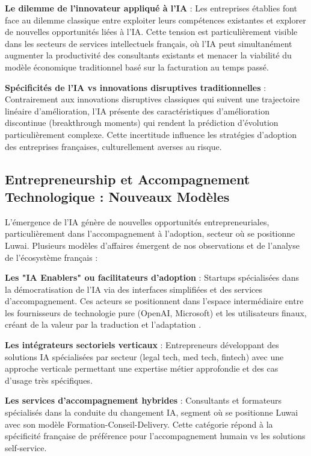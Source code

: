 \textbf{Le dilemme de l'innovateur appliqué à l'IA} : Les entreprises établies font face au dilemme classique entre exploiter leurs compétences existantes et explorer de nouvelles opportunités liées à l'IA. Cette tension est particulièrement visible dans les secteurs de services intellectuels français, où l'IA peut simultanément augmenter la productivité des consultants existants et menacer la viabilité du modèle économique traditionnel basé sur la facturation au temps passé.

\textbf{Spécificités de l'IA vs innovations disruptives traditionnelles} : Contrairement aux innovations disruptives classiques qui suivent une trajectoire linéaire d'amélioration, l'IA présente des caractéristiques d'amélioration discontinue (breakthrough moments) qui rendent la prédiction d'évolution particulièrement complexe. Cette incertitude influence les stratégies d'adoption des entreprises françaises, culturellement averses au risque.

\subsection{Entrepreneurship et Accompagnement Technologique : Nouveaux Modèles}

L'émergence de l'IA génère de nouvelles opportunités entrepreneuriales, particulièrement dans l'accompagnement à l'adoption, secteur où se positionne Luwai. Plusieurs modèles d'affaires émergent de nos observations et de l'analyse de l'écosystème français :

\textbf{Les "IA Enablers" ou facilitateurs d'adoption} : Startups spécialisées dans la démocratisation de l'IA via des interfaces simplifiées et des services d'accompagnement. Ces acteurs se positionnent dans l'espace intermédiaire entre les fournisseurs de technologie pure (OpenAI, Microsoft) et les utilisateurs finaux, créant de la valeur par la traduction et l'adaptation \cite{parker2016platform}.

\textbf{Les intégrateurs sectoriels verticaux} : Entrepreneurs développant des solutions IA spécialisées par secteur (legal tech, med tech, fintech) avec une approche verticale permettant une expertise métier approfondie et des cas d'usage très spécifiques.

\textbf{Les services d'accompagnement hybrides} : Consultants et formateurs spécialisés dans la conduite du changement IA, segment où se positionne Luwai avec son modèle Formation-Conseil-Delivery. Cette catégorie répond à la spécificité française de préférence pour l'accompagnement humain vs les solutions self-service.

